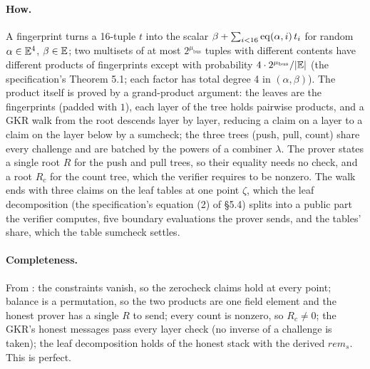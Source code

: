 \paragraph{How.} A fingerprint turns a 16-tuple $t$ into the scalar
$\beta + \sum_{i < 16} \mathrm{eq}(\alpha, i)\, t_i$ for random $\alpha \in \mathbb{E}^4$, $\beta \in \mathbb{E}$; two
multisets of at most $2^{\mu_{\mathrm{bus}}}$ tuples with different contents have different
products of fingerprints except with probability $4 \cdot 2^{\mu_{\mathrm{bus}}} / \lvert \mathbb{E}\rvert$
(the specification's Theorem 5.1; each factor has total degree 4 in $(\alpha, \beta)$). The
product itself is proved by a grand-product argument: the leaves are the fingerprints (padded
with $1$), each layer of the tree holds pairwise products, and a GKR walk from the root
descends layer by layer, reducing a claim on a layer to a claim on the layer below by a
sumcheck; the three trees (push, pull, count) share every challenge and are batched by the
powers of a combiner $\lambda$. The prover states a single root $R$ for the push and pull
trees, so their equality needs no check, and a root $R_c$ for the count tree, which the
verifier requires to be nonzero. The walk ends with three claims on the leaf tables at one point
$\zeta$, which the leaf decomposition (the specification's equation (2) of §5.4) splits into a
public part the verifier computes, five boundary evaluations the prover sends, and the tables'
share, which the table sumcheck settles.

\paragraph{Completeness.} From : the constraints vanish, so the zerocheck claims
hold at every point; balance is a permutation, so the two products are one field element and
the honest prover has a single $R$ to send; every count is nonzero, so $R_c \neq 0$; the GKR's
honest messages pass every layer check (no inverse of a challenge is taken); the leaf
decomposition holds of the honest stack with the derived $\mathit{rem}_s$. This is perfect.

